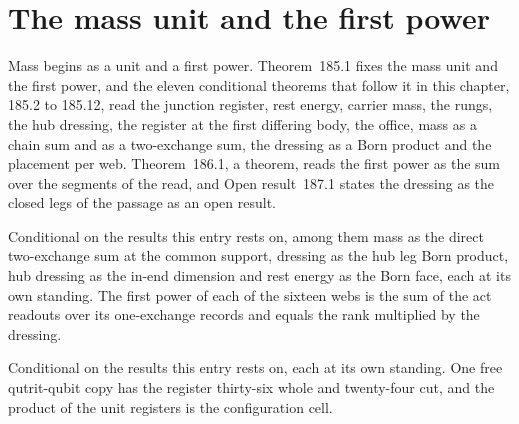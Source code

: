 \section{The mass unit and the first power}\label{mod:VIII-1-mass-unit-and-the-first-power}
\label{narr:open:8-1}Mass begins as a unit and a first power. Theorem~185.1 fixes the mass unit and the first power, and the eleven conditional theorems that follow it in this chapter, 185.2 to 185.12, read the junction register, rest energy, carrier mass, the rungs, the hub dressing, the register at the first differing body, the office, mass as a chain sum and as a two-exchange sum, the dressing as a Born product and the placement per web. Theorem~186.1, a theorem, reads the first power as the sum over the segments of the read, and Open result~187.1 states the dressing as the closed legs of the passage as an open result.
\begin{chconditional}\label{box:VIII-1-mass-unit-and-the-first-power:1}
Conditional on the results this entry rests on, among them mass as the direct two-exchange sum at the common support, dressing as the hub leg Born product, hub dressing as the in-end dimension and rest energy as the Born face, each at its own standing. The first power of each of the sixteen webs is the sum of the act readouts over its one-exchange records and equals the rank multiplied by the dressing.
\end{chconditional}
\begin{chconditional}\label{box:VIII-1-mass-unit-and-the-first-power:2}
Conditional on the results this entry rests on, each at its own standing. One free qutrit-qubit copy has the register thirty-six whole and twenty-four cut, and the product of the unit registers is the configuration cell.
\end{chconditional}
